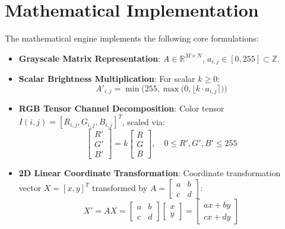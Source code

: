 \documentclass[11pt,a4paper]{article}
\begin{document}
\section{Mathematical Implementation}
The mathematical engine implements the following core formulations:
\begin{itemize}
    \item \textbf{Grayscale Matrix Representation}: $A \in \mathbb{R}^{M \times N}$, $a_{i,j} \in [0, 255] \subset \mathbb{Z}$.
    \item \textbf{Scalar Brightness Multiplication}: For scalar $k \ge 0$:
    \begin{equation}
        A'_{i,j} = \min\Big(255, \max\big(0, \lfloor k \cdot a_{i,j} \rceil\big)\Big)
    \end{equation}
    \item \textbf{RGB Tensor Channel Decomposition}: Color tensor $I(i,j) = [R_{i,j}, G_{i,j}, B_{i,j}]^T$, scaled via:
    \begin{equation}
        \begin{bmatrix} R' \\ G' \\ B' \end{bmatrix} = k \begin{bmatrix} R \\ G \\ B \end{bmatrix}, \quad 0 \le R', G', B' \le 255
    \end{equation}
    \item \textbf{2D Linear Coordinate Transformation}: Coordinate transformation vector $X = [x, y]^T$ transformed by $A = \begin{bmatrix} a & b \\ c & d \end{bmatrix}$:
    \begin{equation}
        X' = AX = \begin{bmatrix} a & b \\ c & d \end{bmatrix} \begin{bmatrix} x \\ y \end{bmatrix} = \begin{bmatrix} ax + by \\ cx + dy \end{bmatrix}
    \end{equation}
\end{itemize}

\end{document}

